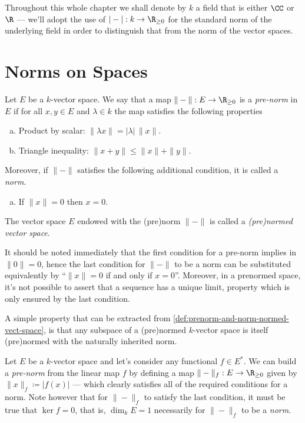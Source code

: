 \begin{remark}
\label{rem:k-is-C-or-R}
Throughout this whole chapter we shall denote by \(k\) a field that is either
\(\CC\) or \(\R\) --- we'll adopt the use of \(|-|: k \to \R_{\geq 0}\) for the
standard norm of the underlying field in order to distinguish that from the norm
of the vector spaces.
\end{remark}

\section{Norms on Spaces}

\begin{definition}
\label{def:prenorm-and-norm-normed-vect-space}
Let \(E\) be a \(k\)-vector space. We say that a map \(\|-\|: E \to
\R_{\geq 0}\) is a \emph{pre-norm} in \(E\) if for all \(x, y \in E\) and
\(\lambda \in k\) the map satisfies the following properties
\begin{enumerate}[(a)]\setlength\itemsep{0em}
\item Product by scalar: \(\|\lambda x\| = |\lambda|\, \|x\|\).
\item Triangle inequality: \(\| x + y \| \leq \| x \| + \| y \|\).
\end{enumerate}
Moreover, if \(\| - \|\) satisfies the following additional condition, it is
called a \emph{norm}.
\begin{enumerate}[(a)]\setlength\itemsep{0em}\setcounter{enumi}{2}
\item If \(\| x \| = 0\) then \(x = 0\).
\end{enumerate}
The vector space \(E\) endowed with the (pre)norm \(\| - \|\) is called a
\emph{(pre)normed vector space}.
\end{definition}

It should be noted immediately that the first condition for a pre-norm implies in
\(\| 0 \| = 0\), hence the last condition for \(\| - \|\) to be a norm can be
substituted equivalently by ``\(\| x \| = 0\) if and only if \(x =
0\)''. Moreover, in a prenormed space, it's not possible to assert that a
sequence has a unique limit, property which is only ensured by the last
condition.

A simple property that can be extracted from
\cref{def:prenorm-and-norm-normed-vect-space}, is that any subspace of a
(pre)normed \(k\)-vector space is itself (pre)normed with the naturally
inherited norm.

\begin{example}
\label{exp:norm-from-functional}
Let \(E\) be a \(k\)-vector space and let's consider any functional \(f \in
E^{*}\). We can build a \emph{pre-norm} from the linear map \(f\) by defining a
map \(\| - \|_f: E \to \R_{\geq 0}\) given by \(\| x \|_f \coloneq |f(x)|\) ---
which clearly satisfies all of the required conditions for a norm. Note however
that for \(\| - \|_f\) to satisfy the last condition, it must be true that
\(\ker f = 0\), that is, \(\dim_{k} E = 1\) necessarily for \(\| - \|_f\) to be
a \emph{norm}.
\end{example}

